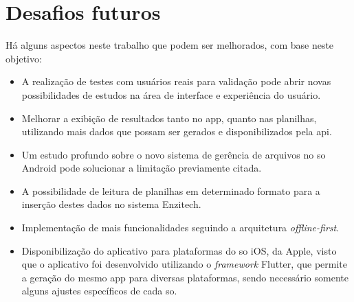 \section{Desafios futuros}\label{sec:futuro}
Há alguns aspectos neste trabalho que podem ser melhorados, com base neste objetivo:
\begin{itemize}
    \item A realização de testes com usuários reais para validação pode abrir novas possibilidades de estudos na área de interface e experiência do usuário.
    \item Melhorar a exibição de resultados tanto no \ac{app}, quanto nas planilhas, utilizando mais dados que possam ser gerados e disponibilizados pela \ac{api}.
    \item Um estudo profundo sobre o novo sistema de gerência de arquivos no \ac{so} Android pode solucionar a limitação previamente citada.
    \item A possibilidade de leitura de planilhas em determinado formato para a inserção destes dados no sistema Enzitech.
    \item Implementação de mais funcionalidades seguindo a arquitetura \textit{offline-first}.
    \item Disponibilização do aplicativo para plataformas do \ac{so} iOS, da Apple, visto que o aplicativo foi desenvolvido utilizando o \textit{framework} Flutter, que permite a geração do mesmo app para diversas plataformas, sendo necessário somente alguns ajustes específicos de cada \ac{so}.
\end{itemize}